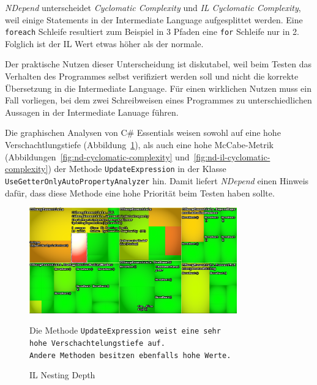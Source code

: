 \emph{NDepend} unterscheidet \emph{Cyclomatic Complexity} und \emph{IL Cyclomatic Complexity}, weil einige Statements in der Intermediate Language aufgesplittet werden. Eine \texttt{foreach} Schleife resultiert zum Beispiel in 3 Pfaden eine \texttt{for} Schleife nur in 2. Folglich ist der IL Wert etwas höher als der normale.

Der praktische Nutzen dieser Unterscheidung ist diskutabel, weil beim Testen das Verhalten des Programmes selbst verifiziert werden soll und nicht die korrekte Übersetzung in die Intermediate Language. Für einen wirklichen Nutzen muss ein Fall vorliegen, bei dem zwei Schreibweisen eines Programmes zu unterschiedlichen Aussagen in der Intermediate Lanuage führen.

Die graphischen Analysen von C\# Essentials weisen sowohl auf eine hohe Verschachtlungstiefe (Abbildung~\ref{fig:nd-il-nesting-depth}), als auch eine hohe McCabe-Metrik (Abbildungen~\ref{fig:nd-cyclomatic-complexity} und~\ref{fig:nd-il-cyclomatic-complexity}) der Methode \texttt{UpdateExpression} in der Klasse \texttt{UseGetterOnlyAutoPropertyAnalyzer} hin. Damit liefert \emph{NDepend} einen Hinweis dafür, dass diese Methode eine hohe Priorität beim Testen haben sollte.

\begin{figure}[!ht]
	\centering
	\includegraphics[width=0.8\textwidth]{images/nd-il-nesting-depth.png}
	\caption{IL Nesting Depth}
	\vspace{0.1cm}
	\label{fig:nd-il-nesting-depth}
	Die Methode \texttt{UpdateExpression weist eine sehr \\ hohe Verschachtelungstiefe auf. \\ Andere Methoden besitzen ebenfalls hohe Werte.}
\end{figure}

